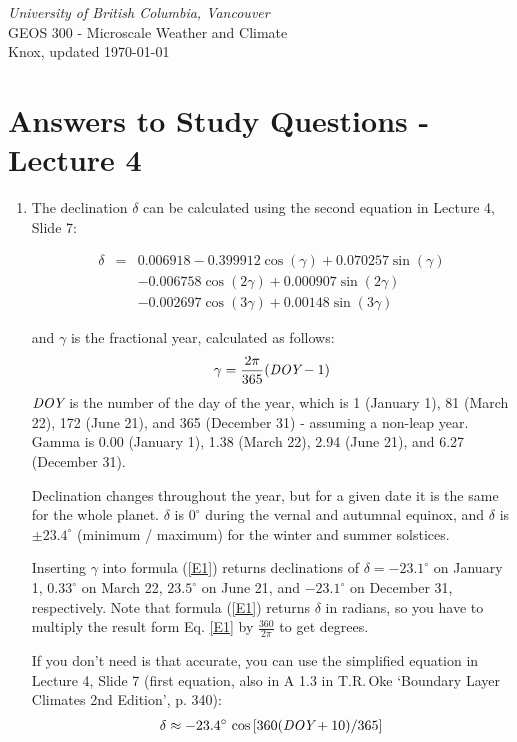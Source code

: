 \documentclass[11pt]{article}
\author{Andreas Christen}
\begin{document}
\begin{center}
\emph{University of British Columbia, Vancouver}\\
GEOS 300 - Microscale Weather and Climate\\
Knox, updated \today
\section*{Answers to Study Questions - Lecture 4}

\vspace{0.5cm}
\end{center}

\begin{enumerate}

\item The declination $\delta$ can be calculated using the second equation in Lecture 4, Slide 7:

\begin{eqnarray}
\label{E1}
\delta &= & 0.006918 - 0.399912 \cos( \gamma)+0.070257 \sin( \gamma)  \\
       && -0.006758 \cos(2 \gamma) + 0.000907\sin(2\gamma) \nonumber \\
       && -0.002697\cos(3\gamma)+0.00148 \sin(3\gamma) \nonumber  
\end{eqnarray}

and $\gamma$ is the fractional year, calculated as follows:
\begin{eqnarray}
\gamma = \frac{2 \pi }{ 365} (\emph{DOY}-1) 
\label{E2}
\end{eqnarray}
$\emph{DOY}$ is the number of the day of the year, which is 1 (January 1), 81 (March 22), 172 (June 21), and 365 (December 31) - assuming a non-leap year. Gamma is 0.00 (January 1),  1.38 (March 22), 2.94 (June 21), and 6.27 (December 31).

Declination changes throughout the year, but for a given date it is the same for the whole planet. $\delta$ is $0^{\circ}$ during the vernal and autumnal equinox, and $\delta$ is $\pm 23.4^{\circ}$ (minimum / maximum) for the winter and summer solstices. 

Inserting $\gamma$ into formula (\ref{E1}) returns declinations of $\delta = -23.1^{\circ}$ on January 1, $0.33^{\circ}$ on March 22, $23.5^{\circ}$ on June 21, and $-23.1^{\circ}$ on December 31, respectively. Note that formula (\ref{E1}) returns $\delta$ in radians, so you have to multiply the result form Eq. \ref{E1} by $\frac{360}{2 \pi}$ to get degrees.

If you don't need is that accurate, you can use the simplified equation in Lecture 4, Slide 7 (first equation, also in A 1.3 in T.R.\,Oke `Boundary Layer Climates 2nd Edition', p. 340):
\begin{eqnarray}
\delta \approx -23.4^{\circ} \, \cos \left[ 360(\emph{DOY} + 10) / 365 \right]
\label{E3}
\end{eqnarray}


\end{enumerate}
\end{document}
